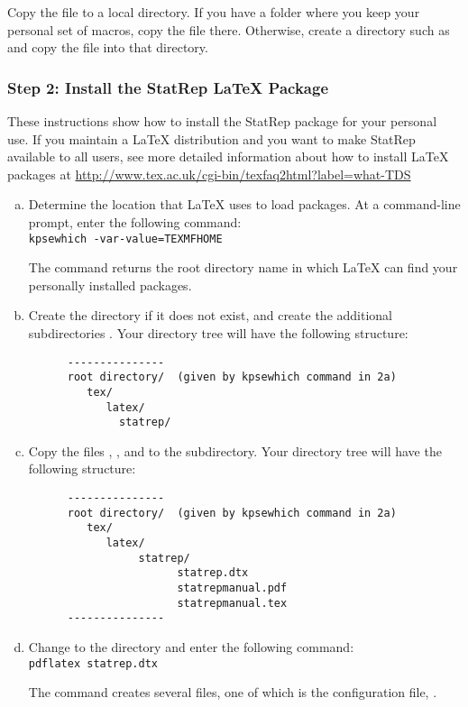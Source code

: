 \documentclass[article,oneside]{memoir}
\begin{document}
   Copy the file  to a local directory. If you have a
   folder where you keep your personal set of macros, copy the file
   there. Otherwise, create a directory such as 
    and copy the file into that directory.

\subsubsection{Step 2: Install the StatRep LaTeX Package}

   These instructions show how to install the StatRep package
   for your personal use. If you maintain a LaTeX distribution and
   you want to make StatRep available to all users, see more
   detailed information about how to install LaTeX packages at
   \url{http://www.tex.ac.uk/cgi-bin/texfaq2html?label=what-TDS}

  \begin{enumerate}[a)]
   \item
   Determine the location that LaTeX uses to load packages. At a
   command-line prompt, enter the following command:\\
   \texttt{kpsewhich -var-value=TEXMFHOME}

   The command returns the root directory name in which LaTeX can
   find your personally installed packages.

   \item
   Create the directory if it does not exist, and create the additional
   subdirectories .
   Your directory tree will have the following structure:
\clearpage
\begin{verbatim}
      ---------------
      root directory/  (given by kpsewhich command in 2a)
         tex/
            latex/
              statrep/
\end{verbatim}
  \item
   Copy the files , , and  to
   the  subdirectory. Your directory tree will have the following structure:
\begin{verbatim}
      ---------------
      root directory/  (given by kpsewhich command in 2a)
         tex/
            latex/
                 statrep/
                       statrep.dtx
                       statrepmanual.pdf
                       statrepmanual.tex
      ---------------
\end{verbatim}
   \item
   Change to the  directory and enter the following command:\\
   \texttt{pdflatex statrep.dtx}

   The command creates several files, one of which is the configuration
   file, .
\end{enumerate}
\end{document}
